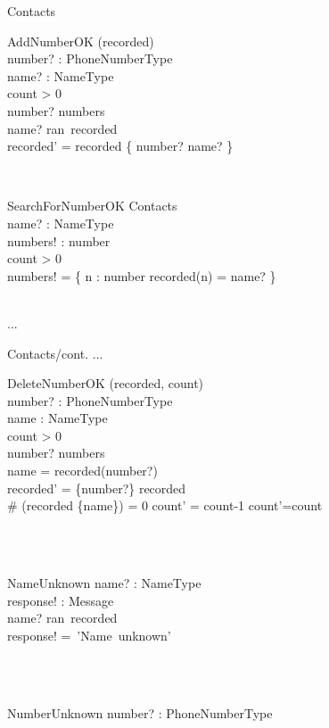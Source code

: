 \documentclass[12pt]{article}
\begin{document}
\begin{spacing}{1.5}
\begin{class}{Contacts}
\begin{op}{AddNumberOK}
\Delta (recorded) \\
number? : PhoneNumberType\\
name? : NameType\\
\ST
count > 0 \\
number? \notin numbers\\
name? \in ran~recorded\\
recorded' = recorded \cup \{ number? \mapsto name? \} \\
\end{op}\\
\begin{op}{SearchForNumberOK}
\Xi Contacts\\
name? : NameType\\
numbers! : \pset number\\
\ST
count > 0 \\
numbers! = \{ n : number \cbar recorded(n) = name? \}
\end{op}\\
...
\end{class}
\newpage
\begin{class}{Contacts/cont.}
...
\also
\begin{op}{DeleteNumberOK}
\Delta (recorded, count) \\
number? : PhoneNumberType\\
name : NameType\\
\ST
count > 0 \\
number? \in numbers\\
name = recorded(number?)\\
recorded' = \{number?\} \ndres recorded \\
 \# (recorded \rres \{name\}) = 0  count' = count-1  count'=count\\
\end{op}\\
\\
\begin{op}{NameUnknown}
name? : NameType\\
response! : Message\\
\ST
name? \notin ran~recorded\\
response! =~'Name~unknown'
\end{op}\\
\\
\begin{op}{NumberUnknown}
number? : PhoneNumberType\\

\end{op}
\end{class}
\end{spacing}
\end{document}
